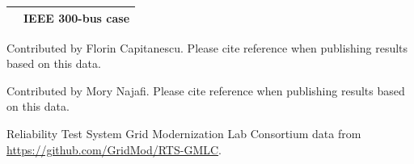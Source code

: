 \documentclass[12pt]{article}
\newcommand{\code}[1]{{\relsize{-0.5}{\tt{{#1}}}}}  %
\numberwithin{equation}{section}
\numberwithin{table}{section}
\numberwithin{figure}{section}
\begin{document}
\begin{appendices}
\begin{table}[!ht]
\begin{threeparttable}
\begin{tabular}{ll}
\code{case300}	& IEEE 300-bus case	\\
\bottomrule
\end{tabular}
\begin{tablenotes}
 \scriptsize
 \item [*] Contributed by Florin Capitanescu. Please cite reference \cite{capitanescu2020} when publishing results based on this data.
 \item [\dag] Contributed by Mory Najafi. Please cite reference \cite{gibbard2014} when publishing results based on this data.
 \item [\ddag] Reliability Test System Grid Modernization Lab Consortium data from\\ \url{https://github.com/GridMod/RTS-GMLC}.
\end{tablenotes}
\end{threeparttable}
\end{table}


\end{appendices}
\end{document}
